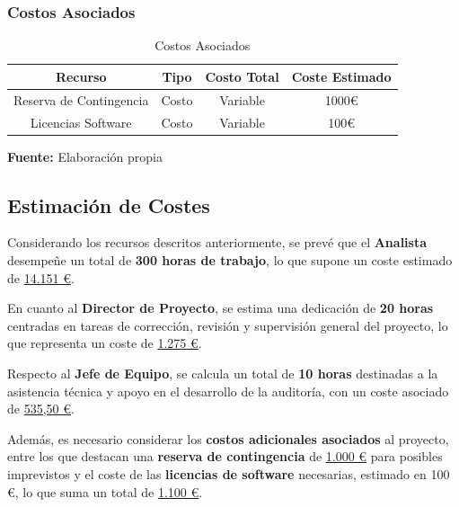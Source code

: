 \documentclass[a4paper, 10pt]{article}
\begin{document}
\subsubsection{Costos Asociados}

\begin{table}[H]
\caption{Costos Asociados}
\centering
\renewcommand{\arraystretch}{1.5}
\begin{tabular}{|c|c|c|c|}
\hline
\textbf{Recurso} & \textbf{Tipo} & \textbf{Costo Total} & \textbf{Coste Estimado}  \\ \hline
Reserva de Contingencia & Costo & Variable & 1000€  \\ \hline
Licencias Software & Costo & Variable &  100€ \\ \hline
\end{tabular}
\begin{flushleft}\centering
    \footnotesize \textbf{Fuente:} Elaboración propia
\end{flushleft}   
\label{tab:costos_asociados}
\end{table}



\subsection{Estimación de Costes}

Considerando los recursos descritos anteriormente, se prevé que el \textbf{Analista} desempeñe un total de \textbf{300 horas de trabajo}, lo que supone un coste estimado de \underline{14.151 €}.  
\par\vspace{0.3cm}

En cuanto al \textbf{Director de Proyecto}, se estima una dedicación de \textbf{20 horas} centradas en tareas de corrección, revisión y supervisión general del proyecto, lo que representa un coste de \underline{1.275 €}.  
\par\vspace{0.3cm}

Respecto al \textbf{Jefe de Equipo}, se calcula un total de \textbf{10 horas} destinadas a la asistencia técnica y apoyo en el desarrollo de la auditoría, con un coste asociado de \underline{535,50 €}.  
\par\vspace{0.3cm}

Además, es necesario considerar los \textbf{costos adicionales asociados} al proyecto, entre los que destacan una \textbf{reserva de contingencia} de \underline{1.000 €} para posibles imprevistos y el coste de las \textbf{licencias de software} necesarias, estimado en 100 €, lo que suma un total de \underline{1.100 €}.  
\par\vspace{0.3cm}
\end{document}
